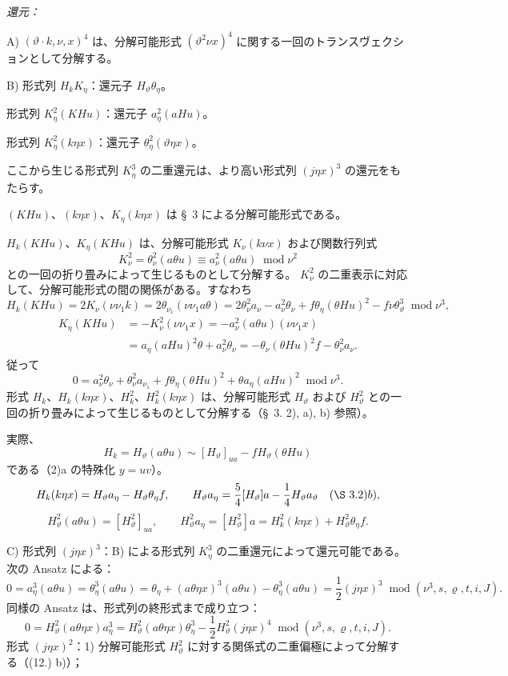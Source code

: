 \documentclass[11pt]{article}
\newcommand{\R}{\varrho}
\newcommand{\modu}[1]{\;\operatorname{mod} #1}
\begin{document}
\noindent\emph{還元：}

\noindent A) $(\vartheta\cdot k,\nu,x)^4$ は、分解可能形式 $(\vartheta^2\nu x)^4$ に関する一回のトランスヴェクションとして分解する。

\noindent B) 形式列 $H_kK_\eta$：還元子 $H_\vartheta\theta_\eta$。

形式列 $K_\eta^2(KHu)$：還元子 $a_\eta^2(aHu)$。

形式列 $K_\eta^2(k\eta x)$：還元子 $\theta_\eta^2(\vartheta\eta x)$。

ここから生じる形式列 $K_\eta^3$ の二重還元は、より高い形式列 $(j\eta x)^3$ の還元をもたらす。

$(KHu)$、$(k\eta x)$、$K_\eta(k\eta x)$ は \S\ 3 による分解可能形式である。

$H_k(KHu)$、$K_\eta(KHu)$ は、分解可能形式 $K_\nu(k\nu x)$ および関数行列式
\[
K_\nu^2=\theta_\nu^2(a\theta u)\equiv a_\nu^2(a\theta u)\modu{\nu^2}
\]
との一回の折り畳みによって生じるものとして分解する。
$K_\nu^2$ の二重表示に対応して、分解可能形式の間の関係がある。すなわち
\[
H_k(KHu)=2K_\nu(\nu\nu_1k)=2\theta_{\nu_1}(\nu\nu_1a\theta)
=2\theta_\nu^2a_\nu-a_\nu^2\theta_\nu+f\theta_\eta(\theta Hu)^2-f\nu\theta_\vartheta^3
\modu{\nu^3},
\]
\[
\begin{aligned}
K_\eta(KHu)&=-K_\nu^2(\nu\nu_1x)
=-a_\nu^2(a\theta u)(\nu\nu_1x)\\
&=a_\eta(aHu)^2\theta+a_\nu^2\theta_\nu
=-\theta_\nu(\theta Hu)^2f-\theta_\nu^2a_\nu.
\end{aligned}
\]
従って
\[
\tag{17}
0=a_\nu^2\theta_\nu+\theta_\nu^2a_{\nu_1}+f\theta_\eta(\theta Hu)^2+\theta a_\eta(aHu)^2\modu{\nu^3}.
\]
形式 $H_k$、$H_k(k\eta x)$、$H_k^2$、$H_k^2(k\eta x)$ は、分解可能形式 $H_\vartheta$ および $H_\vartheta^2$ との一回の折り畳みによって生じるものとして分解する（\S\ 3. 2), a), b) 参照）。

実際、
\[
H_k=H_\vartheta(a\theta u)\sim [H_\vartheta]_{ua}-fH_\vartheta(\theta Hu)
\]
である（2)a の特殊化 $y=uv$）。
\[
H_k(k\eta x)=H_\vartheta a_\eta-H_\vartheta\theta_\eta f,
\qquad
H_\vartheta a_\eta=\frac54[H_\vartheta]a-\frac14H_\vartheta a_\vartheta
\quad(\S\ 3. 2)b),
\]
\[
H_\vartheta^2(a\theta u)=[H_\vartheta^2]_{ua},
\qquad
H_\vartheta^2a_\eta=[H_\vartheta^2]a=H_k^2(k\eta x)+H_\vartheta^2\theta_\eta f.
\]

\noindent C) 形式列 $(j\eta x)^3$：B) による形式列 $K_\eta^3$ の二重還元によって還元可能である。次の Ansatz による：
\[
0=a_\eta^3(a\theta u)=\theta_\eta^3(a\theta u)
=\theta_\eta+(a\theta\eta x)^3(a\theta u)-\theta_\eta^3(a\theta u)
=\frac12(j\eta x)^3\modu{(\nu^3,s,\R,t,i,J)}.
\]
同様の Ansatz は、形式列の終形式まで成り立つ：
\[
0=H_\vartheta^2(a\theta\eta x)a_\eta^3
=H_\vartheta^2(a\theta\eta x)\theta_\eta^3
-\frac12H_\vartheta^2(j\eta x)^4\modu{(\nu^3,s,\R,t,i,J)}.
\]
形式 $(j\eta x)^2$：1) 分解可能形式 $H_\vartheta^2$ に対する関係式の二重偏極によって分解する（(12.) b)）；
\end{document}
